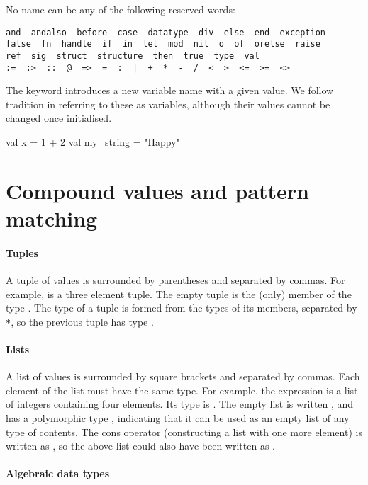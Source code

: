 \documentclass[12pt,a4paper]{book}
\begin{document}
No name can be any of the following reserved words:
\begin{verbatim}
and  andalso  before  case  datatype  div  else  end  exception
false  fn  handle  if  in  let  mod  nil  o  of  orelse  raise
ref  sig  struct  structure  then  true  type  val
:=  :>  ::  @  =>  =  :  |  +  *  -  /  <  >  <=  >=  <>
\end{verbatim}

The  keyword introduces a new variable name with a given value.
We follow tradition in referring to these as variables, although their values
cannot be changed once initialised.
\begin{smlcode}
val x = 1 + 2
val my_string = "Happy"
\end{smlcode}

\section{Compound values and pattern matching}
\label{sect:compound}

\paragraph{Tuples} A tuple of values is surrounded by parentheses and separated by commas. For example,  is a three element tuple. The empty tuple \smlinline{()} is the (only) member of the type . The type of a tuple is formed from the types of its members, separated by \texttt{*}, so the previous tuple has type .

\paragraph{Lists} A list of values is surrounded by square brackets and separated by commas. Each element of the list must have the same type. For example, the expression \smlinline{[1,2,3,4]} is a list of integers containing four elements. Its type is . The empty list is written \smlinline{[]}, and has a polymorphic type , indicating that it can be used as an empty list of any type of contents. The cons operator (constructing a list with one more element) is written as \smlinline{::}, so the above list could also have been written as .

\paragraph{Algebraic data types}
\end{document}
